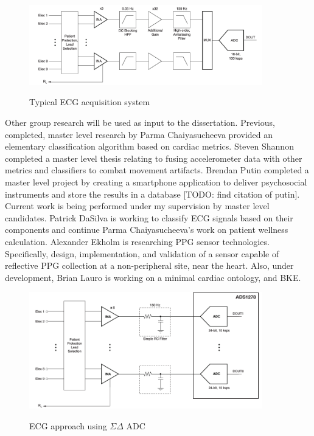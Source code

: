 \begin{figure}
	\begin{center}
		\label{fig:SAR_topology}
		\includegraphics[scale=1,width=0.9\textwidth]{Images/SAR_topology.png} 
		\caption{Typical ECG acquisition system }
	\end{center}
\end{figure}

Other group research will be used as input to the dissertation. Previous, completed, master level research by Parma Chaiyasucheeva provided an elementary classification algorithm based on cardiac metrics\cite{Chaiyasucheeva2012}. Steven Shannon completed a master level thesis relating to fusing accelerometer data with other metrics and classifiers to combat movement artifacts\cite{Shannon2012}. Brendan Putin completed a master level project by creating a smartphone application to deliver psychosocial instruments and store the results in a database [TODO: find citation of putin]. Current work is being performed under my supervision by master level candidates. Patrick DaSilva is working to classify ECG signals based on their components and continue Parma Chaiyasucheeva's work on patient wellness calculation. Alexander Ekholm is researching PPG sensor technologies. Specifically, design, implementation, and validation of a sensor capable of reflective PPG collection at a non-peripheral site, near the heart.  Also, under development, Brian Lauro is working on a minimal cardiac ontology, and BKE.

\begin{figure}
	\begin{center}
		\label{fig:sigmaDelta_topology}
		\includegraphics[scale=1,width=0.9\textwidth]{Images/sigmaDelta_topology_simultanious.png} 
		\caption{ECG approach using $\Sigma\Delta $ ADC}
	\end{center}
\end{figure}

